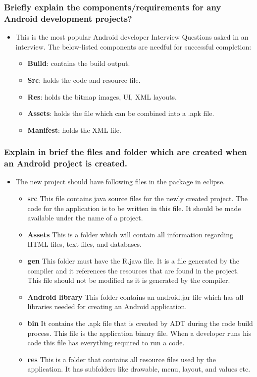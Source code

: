 \documentclass[9pt, b5paper]{article}
\begin{document}
\subsubsection{Briefly explain the components/requirements for any Android development projects?}
\label{sec-1-1-3}
\begin{itemize}
\item This is the most popular Android developer Interview Questions asked in an interview. The below-listed components are needful for successful completion:
\begin{itemize}
\item \textbf{Build}: contains the build output.
\item \textbf{Src}: holds the code and resource file.
\item \textbf{Res}: holds the bitmap images, UI, XML layouts.
\item \textbf{Assets}: holds the file which can be combined into a .apk file.
\item \textbf{Manifest}: holds the XML file.
\end{itemize}
\end{itemize}
\subsubsection{Explain in brief the files and folder which are created when an Android project is created.}
\label{sec-1-1-4}
\begin{itemize}
\item The new project should have following files in the package in eclipse.
\begin{itemize}
\item \textbf{src} This file contains java source files for the newly created project. The code for the application is to be written in this file. It should be made available under the name of a project.
\item \textbf{Assets} This is a folder which will contain all information regarding HTML files, text files, and databases.
\item \textbf{gen} This folder must have the R.java file. It is a file generated by the compiler and it references the resources that are found in the project. This file should not be modified as it is generated by the compiler.
\item \textbf{Android library} This folder contains an android.jar file which has all libraries needed for creating an Android application.
\item \textbf{bin} It contains the .apk file that is created by ADT during the code build process. This file is the application binary file. When a developer runs his code this file has everything required to run a code.
\item \textbf{res} This is a folder that contains all resource files used by the application. It has subfolders like drawable, menu, layout, and values etc.
\end{itemize}
\end{itemize}
\end{document}
